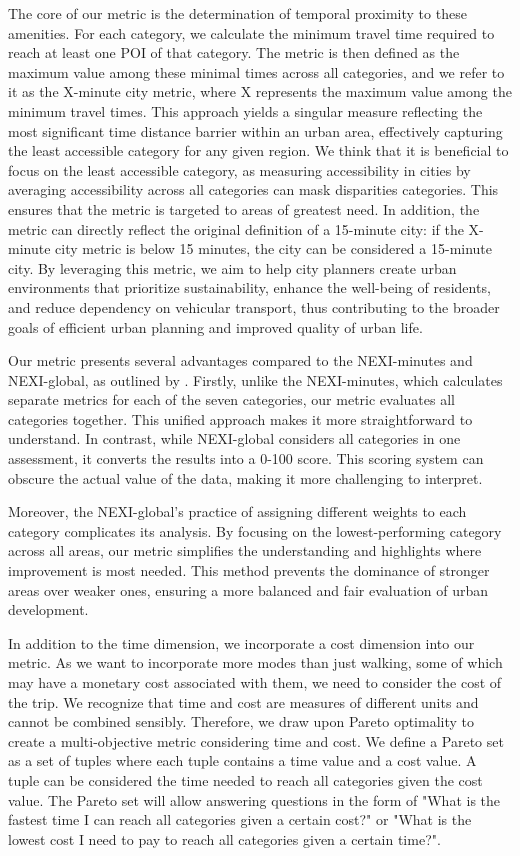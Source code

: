 The core of our metric is the determination of temporal proximity to these amenities. 
For each category, we calculate the minimum travel time required to reach at least one POI of that category. 
The metric is then defined as the maximum value among these minimal times across all categories, and we refer to it as the X-minute city metric, where X represents the maximum value among the minimum travel times.
This approach yields a singular measure reflecting the most significant time distance barrier within an urban area, effectively capturing the least accessible category for any given region.
We think that it is beneficial to focus on the least accessible category, as measuring accessibility in cities by averaging accessibility across all categories can mask disparities categories. 
This ensures that the metric is targeted to areas of greatest need. 
In addition, the metric can directly reflect the original definition of a 15-minute city: if the X-minute city metric is below 15 minutes, the city can be considered a 15-minute city.
By leveraging this metric, we aim to help city planners create urban environments that prioritize sustainability, enhance the well-being of residents, and reduce dependency on vehicular transport, thus contributing to the broader goals of efficient urban planning and improved quality of urban life.

Our metric presents several advantages compared to the NEXI-minutes and NEXI-global, as outlined by .
Firstly, unlike the NEXI-minutes, which calculates separate metrics for each of the seven categories, our metric evaluates all categories together. 
This unified approach makes it more straightforward to understand. 
In contrast, while NEXI-global considers all categories in one assessment, it converts the results into a 0-100 score. 
This scoring system can obscure the actual value of the data, making it more challenging to interpret.

Moreover, the NEXI-global's practice of assigning different weights to each category complicates its analysis. 
By focusing on the lowest-performing category across all areas, our metric simplifies the understanding and highlights where improvement is most needed. 
This method prevents the dominance of stronger areas over weaker ones, ensuring a more balanced and fair evaluation of urban development. 

In addition to the time dimension, we incorporate a cost dimension into our metric.
As we want to incorporate more modes than just walking, some of which may have a monetary cost associated with them, we need to consider the cost of the trip.
We recognize that time and cost are measures of different units and cannot be combined sensibly.
Therefore, we draw upon Pareto optimality to create a multi-objective metric considering time and cost.
We define a Pareto set as a set of tuples where each tuple contains a time value and a cost value.
A tuple can be considered the time needed to reach all categories given the cost value.
The Pareto set will allow answering questions in the form of "What is the fastest time I can reach all categories given a certain cost?" or "What is the lowest cost I need to pay to reach all categories given a certain time?".

